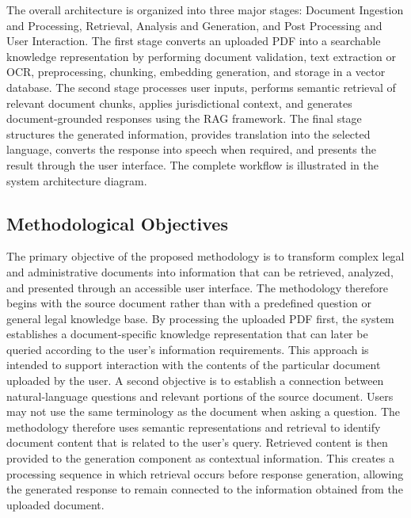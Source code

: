 \documentclass[12pt,a4paper,oneside]{report}
\begin{document}
The overall architecture is organized into three major stages: Document
Ingestion and Processing, Retrieval, Analysis and Generation, and Post
Processing and User Interaction. The first stage converts an uploaded PDF
into a searchable knowledge representation by performing document
validation, text extraction or OCR, preprocessing, chunking, embedding
generation, and storage in a vector database. The second stage processes
user inputs, performs semantic retrieval of relevant document chunks,
applies jurisdictional context, and generates document-grounded responses
using the RAG framework. The final stage structures the generated
information, provides translation into the selected language, converts the
response into speech when required, and presents the result through the user
interface. The complete workflow is illustrated in the system architecture
diagram.

\subsection{Methodological Objectives}

The primary objective of the proposed methodology is to transform complex
legal and administrative documents into information that can be retrieved,
analyzed, and presented through an accessible user interface. The methodology
therefore begins with the source document rather than with a predefined
question or general legal knowledge base. By processing the uploaded PDF
first, the system establishes a document-specific knowledge representation
that can later be queried according to the user's information requirements.
This approach is intended to support interaction with the contents of the
particular document uploaded by the user. A second objective is to establish a connection between natural-language
questions and relevant portions of the source document. Users may not use
the same terminology as the document when asking a question. The methodology
therefore uses semantic representations and retrieval to identify document
content that is related to the user's query. Retrieved content is then
provided to the generation component as contextual information. This creates
a processing sequence in which retrieval occurs before response generation,
allowing the generated response to remain connected to the information
obtained from the uploaded document.
\end{document}
